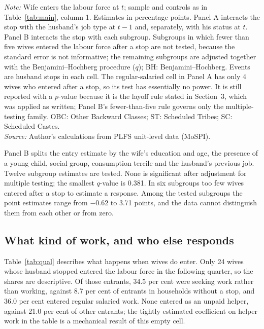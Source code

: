 \begin{table}[htbp]
\centering
\caption{Layoff checks and heterogeneity in wives' entry into the labour force}
\label{tab:het}
\scriptsize
\begin{minipage}{\linewidth}\footnotesize\vspace{4pt}
\textit{Note:} Wife enters the labour force at $t$; sample and controls as in Table~\ref{tab:main}, column 1. Estimates in percentage points. Panel A interacts the stop with the husband's job type at $t-1$ and, separately, with his status at $t$. Panel B interacts the stop with each subgroup. Subgroups in which fewer than five wives entered the labour force after a stop are not tested, because the standard error is not informative; the remaining subgroups are adjusted together with the Benjamini--Hochberg procedure ($q$); BH: Benjamini--Hochberg. Events are husband stops in each cell. The regular-salaried cell in Panel A has only 4 wives who entered after a stop, so its test has essentially no power. It is still reported with a $p$-value because it is the layoff rule stated in Section~3, which was applied as written; Panel B's fewer-than-five rule governs only the multiple-testing family. OBC: Other Backward Classes; ST: Scheduled Tribes; SC: Scheduled Castes.\\
\textit{Source:} Author's calculations from PLFS unit-level data (MoSPI).
\end{minipage}
\end{table}

Panel B splits the entry estimate by the wife's education and age, the presence of a young child, social group, consumption tercile and the husband's previous job. Twelve subgroup estimates are tested. None is significant after adjustment for multiple testing; the smallest $q$-value is 0.381. In six subgroups too few wives entered after a stop to estimate a response. Among the tested subgroups the point estimates range from $-0.62$ to 3.71 points, and the data cannot distinguish them from each other or from zero.

\subsection{What kind of work, and who else responds}

Table~\ref{tab:qual} describes what happens when wives do enter. Only 24 wives whose husband stopped entered the labour force in the following quarter, so the shares are descriptive. Of those entrants, 34.5 per cent were seeking work rather than working, against 8.7 per cent of entrants in households without a stop, and 36.0 per cent entered regular salaried work. None entered as an unpaid helper, against 21.0 per cent of other entrants; the tightly estimated coefficient on helper work in the table is a mechanical result of this empty cell.

